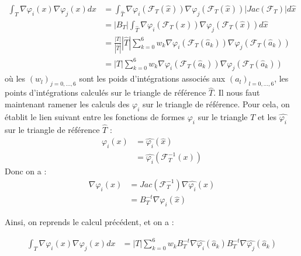 \documentclass[a4paper,12pt]{article}
\begin{document}
\begin{equation*}
\begin{split}
\int_T \nabla \varphi_i (x) \nabla \varphi_j (x) dx & = \int_{\widehat{T}} \nabla \varphi_i \left( \mathcal{F}_T ( \widehat{x} ) \right) \nabla \varphi_j \left( \mathcal{F}_T (\widehat{x}) \right) \left| Jac \left( \mathcal{F}_T \right) \right| d \widehat{x} \\
& = \left| B_T \right| \int_{\widehat{T}} \nabla \varphi_i \left( \mathcal{F}_T ( \widehat{x} ) \right) \nabla \varphi_j \left( \mathcal{F}_T (\widehat{x}) \right) d\widehat{x} \\
& = \frac{\left| T \right|}{ | \widehat{T} |} | \widehat{T} | \sum_{k = 0}^{6} w_k  \nabla \varphi_i \left( \mathcal{F}_T ( \widehat{a}_k ) \right) \nabla \varphi_j \left( \mathcal{F}_T (\widehat{a}_k) \right) \\ 
& = | T | \sum_{k = 0}^{6} w_k  \nabla \varphi_i \left( \mathcal{F}_T ( \widehat{a}_k ) \right) \nabla \varphi_j \left( \mathcal{F}_T (\widehat{a}_k) \right) 
\end{split}
\end{equation*}
où les $(w_l)_{j =0,...,6}$ sont les poids d'intégrations associés aux $(a_l)_{l = 0,...,6}$, les points d'intégrations calculés sur le triangle de référence $\widehat{T}$. Il nous faut maintenant ramener les calculs des $\varphi_i$ sur le triangle de référence. Pour cela, on établit le lien suivant entre les fonctions de formes $\varphi_i$ sur le triangle $T$ et les $\widehat{\varphi_i}$ sur le triangle de référence $\widehat{T}$ :
\begin{equation*}
\begin{split}
\varphi_i (x) & = \widehat{\varphi_i} ( \widehat{x} ) \\
& = \widehat{\varphi_i} \left( \mathcal{F}^{-1}_T (x) \right)
\end{split}
\end{equation*}
Donc on a :
\begin{equation}
\begin{split}
\nabla \varphi_i (x) & = Jac \left( \mathcal{F}^{-1}_T \right) \nabla \widehat{\varphi_i} ( \widehat{x} ) \\
& = B^{-t}_T \nabla \widehat{\varphi_i} ( \widehat{x} ) 
\end{split}
\end{equation}

Ainsi, on reprends le calcul précédent, et on a :

\begin{equation}
\begin{split}
\int_T \nabla \varphi_i (x) \nabla \varphi_j (x) dx & = |T| \sum_{k=0}^{6} w_k B^{-t}_T \nabla \widehat{\varphi_i} (\widehat{a}_k) B^{-t}_T \nabla \widehat{\varphi_j} (\widehat{a}_k)
\end{split}
\end{equation}
\end{document}
